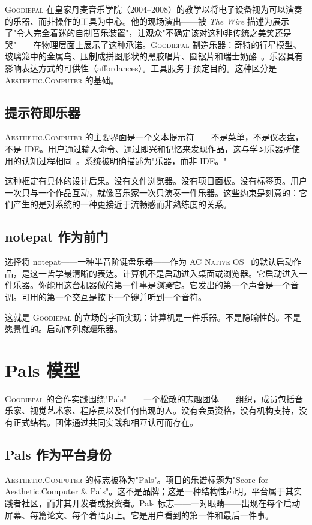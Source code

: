 \documentclass[10pt,letterpaper,twocolumn]{article}
\newcommand{\ac}{\textsc{Aesthetic.Computer}}
\newcommand{\acos}{\textsc{AC Native OS}}
\newcommand{\gp}{\textsc{Goodiepal}}
\begin{document}
\gp{} 在皇家丹麦音乐学院（2004--2008）的教学以将电子设备视为可以演奏的乐器、而非操作的工具为中心。他的现场演出——被 \emph{The Wire} 描述为展示了"令人完全着迷的自制音乐装置"，让观众"不确定该对这种非传统之美笑还是哭"——在物理层面上展示了这种承诺。\gp{} 制造乐器：奇特的行星模型、玻璃笼中的金属鸟、压制成拼图形状的黑胶唱片、圆锯片和瑞士奶酪~\citep{inspite2024goodiepal}。乐器具有影响表达方式的可供性（affordances）。工具服务于预定目的。这种区分是 \ac{} 的基础。

\subsection{提示符即乐器}

\ac{} 的主要界面是一个文本提示符——不是菜单，不是仪表盘，不是 IDE。用户通过输入命令、通过即兴和记忆来发现作品，这与学习乐器所使用的认知过程相同~\citep{scudder2026ac}。系统被明确描述为"乐器，而非 IDE。"

这种框定有具体的设计后果。没有文件浏览器。没有项目面板。没有标签页。用户一次只与一个作品互动，就像音乐家一次只演奏一件乐器。这些约束是刻意的：它们产生的是对系统的一种更接近于流畅感而非熟练度的关系。

\subsection{notepat 作为前门}

选择将 notepat——一种半音阶键盘乐器——作为 \acos{}~\citep{scudder2026notepat} 的默认启动作品，是这一哲学最清晰的表达。计算机不是启动进入桌面或浏览器。它启动进入一件乐器。你能用这台机器做的第一件事是\emph{演奏}它。它发出的第一个声音是一个音调。可用的第一个交互是按下一个键并听到一个音符。

这就是 \gp{} 的立场的字面实现：计算机是一件乐器。不是隐喻性的。不是愿景性的。启动序列\emph{就是}乐器。

\section{Pals 模型}

\gp{} 的合作实践围绕"Pals"——一个松散的志趣团体——组织，成员包括音乐家、视觉艺术家、程序员以及任何出现的人。没有会员资格，没有机构支持，没有正式结构。团体通过共同实践和相互认可而存在。

\subsection{Pals 作为平台身份}

\ac{} 的标志被称为"Pals"。项目的乐谱标题为"Score for Aesthetic.Computer \& Pals"。这不是品牌；这是一种结构性声明。平台属于其实践者社区，而非其开发者或投资者。Pals 标志——一对眼睛——出现在每个启动屏幕、每篇论文、每个着陆页上。它是用户看到的第一件和最后一件事。
\end{document}
